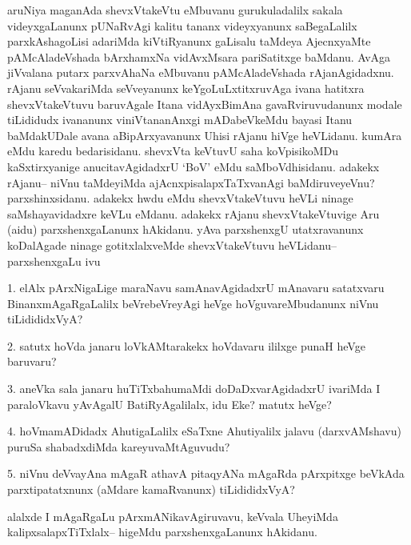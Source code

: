\begin{artha}
aruNiya maganAda shevxVtakeVtu eMbuvanu gurukuladalilx sakala videyxgaLanunx pUNaRvAgi kalitu tananx videyxyanunx saBegaLalilx  parxkAshagoLisi adariMda kiVtiRyanunx gaLisalu taMdeya AjecnxyaMte pAMcAladeVshada bArxhamxNa vidAvxMsara pariSatitxge baMdanu. AvAga jiVvalana putarx parxvAhaNa eMbuvanu pAMcAladeVshada rAjanAgidadxnu. rAjanu seVvakariMda seVveyanunx keYgoLuLxtitxruvAga ivana hatitxra shevxVtakeVtuvu baruvAgale Itana vidAyxBimAna gavaRviruvudanunx modale tiLididudx ivananunx viniVtananAnxgi mADabeVkeMdu  bayasi Itanu baMdakUDale avana aBipArxyavanunx Uhisi rAjanu hiVge heVLidanu. kumAra eMdu karedu bedarisidanu. shevxVta keVtuvU saha koVpisikoMDu kaSxtirxyanige anucitavAgidadxrU `BoV' eMdu saMboVdhisidanu. adakekx rAjanu-- niVnu taMdeyiMda ajAcnxpisalapxTaTxvanAgi baMdiruveyeVnu? parxshinxsidanu. adakekx hwdu eMdu shevxVtakeVtuvu heVLi ninage saMshayavidadxre keVLu eMdanu. adakekx rAjanu shevxVtakeVtuvige Aru (aidu) parxshenxgaLanunx hAkidanu. yAva parxshenxgU utatxravanunx koDalAgade ninage gotitxlalxveMde shevxVtakeVtuvu heVLidanu-- parxshenxgaLu ivu

1. elAlx pArxNigaLige maraNavu samAnavAgidadxrU mAnavaru satatxvaru BinanxmAgaRgaLalilx beVrebeVreyAgi heVge hoVguvareMbudanunx niVnu tiLidididxVyA?

2. satutx hoVda janaru loVkAMtarakekx hoVdavaru ililxge punaH heVge baruvaru?

3. aneVka sala janaru huTiTxbahumaMdi doDaDxvarAgidadxrU ivariMda I paraloVkavu yAvAgalU BatiRyAgalilalx, idu Eke? matutx heVge?

4. hoVmamADidadx AhutigaLalilx eSaTxne Ahutiyalilx jalavu (darxvAMshavu) puruSa shabadxdiMda kareyuvaMtAguvudu?

5. niVnu deVvayAna mAgaR athavA pitaqyANa mAgaRda pArxpitxge beVkAda parxtipatatxnunx (aMdare kamaRvanunx) tiLidididxVyA?

alalxde I mAgaRgaLu pArxmANikavAgiruvavu, keVvala UheyiMda kalipxsalapxTiTxlalx-- higeMdu parxshenxgaLanunx hAkidanu. 
\end{artha}

